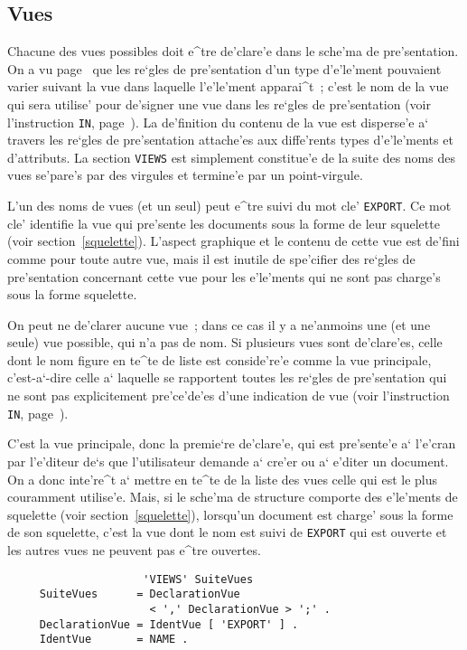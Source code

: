 {\subsection{Vues}

Chacune des vues possibles doit e^tre de'clare'e dans le sche'ma de
pre'sentation. On a vu page~\pageref{lesvues} que les re`gles de pre'sentation
d'un type d'e'le'ment pouvaient varier suivant la vue dans laquelle
l'e'le'ment apparai^t~; c'est le nom de la vue qui sera utilise' pour
de'signer une vue dans les re`gles de pre'sentation (voir l'instruction
{\tt IN}, page~\pageref{instrin}). La de'finition du contenu de la vue est
disperse'e a` travers les re`gles de pre'sentation attache'es aux diffe'rents
types d'e'le'ments et d'attributs. La section {\tt VIEWS} est simplement
constitue'e de la suite des noms des vues se'pare's par des virgules et
termine'e par un point-virgule.

L'un des noms de vues (et un seul) peut e^tre suivi du mot cle' {\tt EXPORT}.
Ce mot cle' identifie la vue qui pre'sente les documents sous la forme de
leur squelette (voir section~\ref{squelette}). L'aspect graphique et le contenu
de cette  vue est de'fini comme pour toute autre vue, mais il est inutile
de spe'cifier des re`gles de pre'sentation concernant cette vue pour les
e'le'ments qui ne sont pas charge's sous la forme squelette.

On peut ne de'clarer aucune vue~; dans ce cas il y a ne'anmoins une (et une
seule) vue possible, qui n'a pas de nom. Si plusieurs vues sont de'clare'es,
celle dont le nom figure en te^te de liste est conside're'e comme la vue
principale, c'est-a`-dire celle a` laquelle se rapportent toutes les re`gles
de pre'sentation qui ne sont pas explicitement pre'ce'de'es d'une indication
de vue (voir l'instruction {\tt IN}, page~\pageref{instrin}).

C'est la vue principale, donc la premie`re de'clare'e, qui est pre'sente'e a`
l'e'cran par l'e'diteur de`s que l'utilisateur demande a` cre'er ou a` e'diter
un document. On a donc inte're^t a` mettre en te^te de la liste des vues celle
qui est le plus couramment utilise'e. Mais, si le sche'ma de structure
comporte des e'le'ments de squelette (voir section~\ref{squelette}), lorsqu'un
document est charge' sous la forme de son squelette, c'est la vue dont le
nom est suivi de {\tt EXPORT} qui est ouverte et les autres vues
ne peuvent pas e^tre ouvertes.

\begin{verbatim}
                     'VIEWS' SuiteVues
     SuiteVues      = DeclarationVue
                      < ',' DeclarationVue > ';' .
     DeclarationVue = IdentVue [ 'EXPORT' ] .
     IdentVue       = NAME .
\end{verbatim}

}

